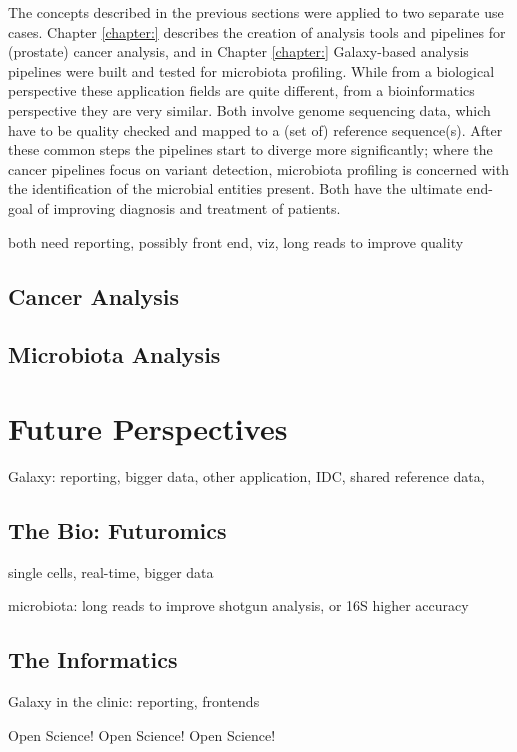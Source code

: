 The concepts described in the previous sections were applied to two separate use cases. Chapter \ref{chapter:} describes the creation of analysis tools and pipelines for (prostate) cancer analysis, and in Chapter \ref{chapter:} Galaxy-based analysis pipelines were built and tested for microbiota profiling. While from a biological perspective these application fields are quite different, from a bioinformatics perspective they are very similar. Both involve genome sequencing data, which have to be quality checked and mapped to a (set of) reference sequence(s). After these common steps the pipelines start to diverge more significantly; where the cancer pipelines focus on variant detection, microbiota profiling is concerned with the identification of the microbial entities present. Both have the ultimate end-goal of improving diagnosis and treatment of patients.

both need reporting, possibly front end, viz, long reads to improve quality

\subsection{Cancer Analysis}

\subsection{Microbiota Analysis}


\section{Future Perspectives}

Galaxy: reporting, bigger data, other application, IDC, shared reference data,

\subsection{The Bio: Futuromics}
single cells, real-time, bigger data

microbiota: long reads to improve shotgun analysis, or 16S higher accuracy

\subsection{The Informatics}

Galaxy in the clinic: reporting, frontends

Open Science! Open Science! Open Science!



